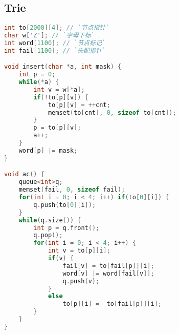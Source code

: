 ﻿\subsection{Trie}
	\begin{lstlisting}[language=C++]
int to[2000][4]; // `节点指针`
char w['Z']; // `字母下标`
int word[1100]; // `节点标记`
int fail[1100]; // `失配指针`

void insert(char *a, int mask) {
	int p = 0;
	while(*a) {
		int v = w[*a];
		if(!to[p][v]) {
			to[p][v] = ++cnt;
			memset(to[cnt], 0, sizeof to[cnt]);
		}
		p = to[p][v];
		a++;
	}
	word[p] |= mask;
}

void ac() {
	queue<int>q;
	memset(fail, 0, sizeof fail);
	for(int i = 0; i < 4; i++) if(to[0][i]) {
		q.push(to[0][i]);	
	}
	while(q.size()) {
		int p = q.front();
		q.pop();
		for(int i = 0; i < 4; i++) {
			int v = to[p][i];
			if(v) {
				fail[v] = to[fail[p]][i];
				word[v] |= word[fail[v]];
				q.push(v);
			}
			else 
				to[p][i] =  to[fail[p]][i];
		}
	}
}
	\end{lstlisting}
